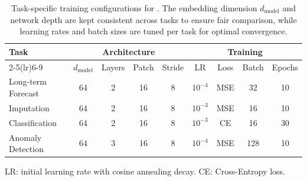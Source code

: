 \begin{table}[thbp]
  \vspace{-5pt}
  \caption{Task-specific training configurations for \model. The embedding dimension $d_{\text{model}}$ and network depth are kept consistent across tasks to ensure fair comparison, while learning rates and batch sizes are tuned per task for optimal convergence.}\label{tab:model_config}
  \vskip 0.05in
  \centering
  \begin{threeparttable}
  \begin{small}
  \renewcommand{\multirowsetup}{\centering}
  \setlength{\tabcolsep}{3.8pt}
  \begin{tabular}{l|cccc|cccc}
    \toprule
    \multirow{2}{*}{\textbf{Task}} & \multicolumn{4}{c|}{\textbf{Architecture}} & \multicolumn{4}{c}{\textbf{Training}} \\
    \cmidrule(lr){2-5}\cmidrule(lr){6-9}
    & $d_{\text{model}}$ & Layers & Patch & Stride & LR & Loss & Batch & Epochs\\
    \midrule
    Long-term Forecast & 64 & 2 & 16 & 8 & $10^{-4}$ & MSE & 32 & 10 \\
    Imputation & 64 & 2 & 16 & 8 & $10^{-3}$ & MSE & 16 & 10 \\
    Classification & 64 & 2 & 16 & 8 & $10^{-3}$ & CE & 16 & 30 \\
    Anomaly Detection & 64 & 3 & 16 & 8 & $10^{-4}$ & MSE & 128 & 10 \\
    \bottomrule
  \end{tabular}
  \begin{tablenotes}
    \footnotesize
    \item[] LR: initial learning rate with cosine annealing decay. CE: Cross-Entropy loss.
  \end{tablenotes}
  \end{small}
  \end{threeparttable}
  \vspace{-5pt}
\end{table}

